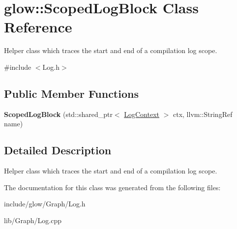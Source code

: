 \hypertarget{classglow_1_1_scoped_log_block}{}\section{glow\+:\+:Scoped\+Log\+Block Class Reference}
\label{classglow_1_1_scoped_log_block}


Helper class which traces the start and end of a compilation log scope.  




{\ttfamily \#include $<$Log.\+h$>$}

\subsection*{Public Member Functions}
\begin{DoxyCompactItemize}
\item 
\mbox{\label{classglow_1_1_scoped_log_block_acf0d1f6fb429fe925891fe9796fa3d72}} 
{\bfseries Scoped\+Log\+Block} (std\+::shared\+\_\+ptr$<$ \hyperlink{classglow_1_1_log_context}{Log\+Context} $>$ ctx, llvm\+::\+String\+Ref name)
\end{DoxyCompactItemize}


\subsection{Detailed Description}
Helper class which traces the start and end of a compilation log scope. 

The documentation for this class was generated from the following files\+:\begin{DoxyCompactItemize}
\item 
include/glow/\+Graph/Log.\+h\item 
lib/\+Graph/Log.\+cpp\end{DoxyCompactItemize}
